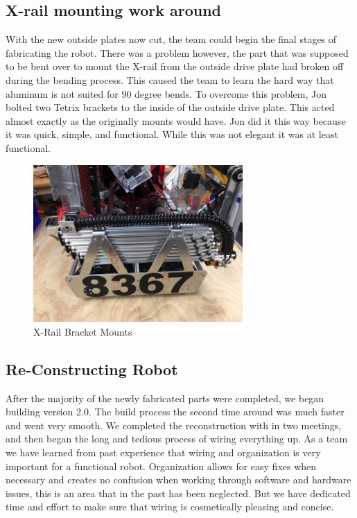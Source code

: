 \documentclass{article}
\begin{document}
\subsection{X-rail mounting work around}
With the new outside plates now cut, the team could begin the final stages of fabricating the robot. There was a problem however, the part that was supposed to be bent over to mount the X-rail from the outside drive plate had broken off during the bending process. This caused the team to learn the hard way that aluminum is not suited for 90 degree bends. To overcome this problem, Jon bolted two Tetrix brackets to the inside of the outside drive plate. This acted almost exactly as the originally mounts would have. Jon did it this way because it was quick, simple, and functional. While this was not elegant it was at least functional.

\begin{figure}
    \centering
    \includegraphics[height=6cm]{18_12-31/images/Xrail.JPG}
    \caption{X-Rail Bracket Mounts}
    \label{X-Rail Mounts}
\end{figure}



\subsection{Re-Constructing Robot}
After the majority of the newly fabricated parts were completed, we began building version 2.0. The build process the second time around was much faster and went very smooth. We completed the reconstruction with in two meetings, and then began the long and tedious process of wiring everything up. As a team we have learned from past experience that wiring and organization is very important for a functional robot. Organization allows for easy fixes when necessary and creates no confusion when working through software and hardware issues, this is an area that in the past has been neglected. But we have dedicated time and effort to make sure that wiring is cosmetically pleasing and concise. 
\end{document}
